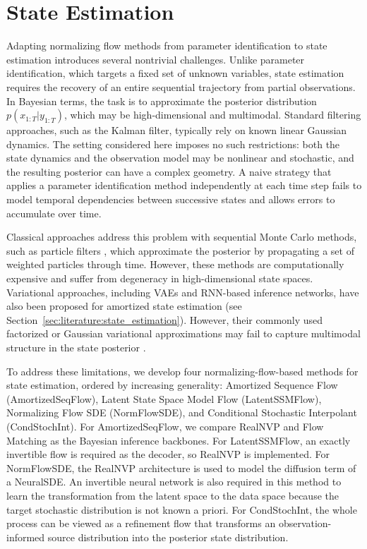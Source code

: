 \section{State Estimation}
\label{sec:methods:state_estimation}

Adapting normalizing flow methods from parameter identification to state estimation introduces several nontrivial challenges. Unlike parameter identification, which targets a fixed set of unknown variables, state estimation requires the recovery of an entire sequential trajectory from partial observations. In Bayesian terms, the task is to approximate the posterior distribution $p(x_{1:T} | y_{1:T})$, which may be high-dimensional and multimodal. Standard filtering approaches, such as the Kalman filter, typically rely on known linear Gaussian dynamics. The setting considered here imposes no such restrictions: both the state dynamics and the observation model may be nonlinear and stochastic, and the resulting posterior can have a complex geometry. A naive strategy that applies a parameter identification method independently at each time step fails to model temporal dependencies between successive states and allows errors to accumulate over time.

Classical approaches address this problem with sequential Monte Carlo methods, such as particle filters \citep{Nemeth_2014}, which approximate the posterior by propagating a set of weighted particles through time. However, these methods are computationally expensive and suffer from degeneracy in high-dimensional state spaces. Variational approaches, including \acp{VAE} and RNN-based inference networks, have also been proposed for amortized state estimation (see Section~\ref{sec:literature:state_estimation}). However, their commonly used factorized or Gaussian variational approximations may fail to capture multimodal structure in the state posterior \citep{rezende2016, morningstar21b}.

To address these limitations, we develop four normalizing-flow-based methods for state estimation, ordered by increasing generality: Amortized Sequence Flow (AmortizedSeqFlow), Latent State Space Model Flow (LatentSSMFlow), Normalizing Flow SDE (NormFlowSDE), and Conditional Stochastic Interpolant (CondStochInt). For AmortizedSeqFlow, we compare RealNVP and Flow Matching as the Bayesian inference backbones. For LatentSSMFlow, an exactly invertible flow is required as the decoder, so RealNVP is implemented. For NormFlowSDE, the RealNVP architecture is used to model the diffusion term of a NeuralSDE. An invertible neural network is also required in this method to learn the transformation from the latent space to the data space because the target stochastic distribution is not known a priori. For CondStochInt, the whole process can be viewed as a refinement flow that transforms an observation-informed source distribution into the posterior state distribution.

